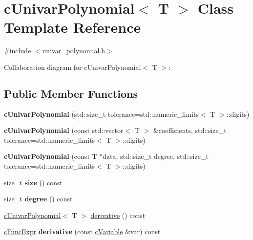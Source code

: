\hypertarget{classcUnivarPolynomial}{\section{c\-Univar\-Polynomial$<$ T $>$ Class Template Reference}
\label{classcUnivarPolynomial}
}


{\ttfamily \#include $<$univar\-\_\-polynomial.\-h$>$}



Collaboration diagram for c\-Univar\-Polynomial$<$ T $>$\-:
\subsection*{Public Member Functions}
\begin{DoxyCompactItemize}
\item 
\hypertarget{classcUnivarPolynomial_a4ff2b63bc58ec4ab56f270237caf6f0b}{{\bfseries c\-Univar\-Polynomial} (std\-::size\-\_\-t tolerance=std\-::numeric\-\_\-limits$<$ T $>$\-::digits)}\label{classcUnivarPolynomial_a4ff2b63bc58ec4ab56f270237caf6f0b}

\item 
\hypertarget{classcUnivarPolynomial_a967378cb72bc82a047800e9b52051ccd}{{\bfseries c\-Univar\-Polynomial} (const std\-::vector$<$ T $>$ \&coefficients, std\-::size\-\_\-t tolerance=std\-::numeric\-\_\-limits$<$ T $>$\-::digits)}\label{classcUnivarPolynomial_a967378cb72bc82a047800e9b52051ccd}

\item 
\hypertarget{classcUnivarPolynomial_aa32abc2e773a74b65e960a24cf65f70b}{{\bfseries c\-Univar\-Polynomial} (const T $\ast$data, std\-::size\-\_\-t degree, std\-::size\-\_\-t tolerance=std\-::numeric\-\_\-limits$<$ T $>$\-::digits)}\label{classcUnivarPolynomial_aa32abc2e773a74b65e960a24cf65f70b}

\item 
\hypertarget{classcUnivarPolynomial_adbabe3b2fa5052c19f87327de092c8fb}{size\-\_\-t {\bfseries size} () const }\label{classcUnivarPolynomial_adbabe3b2fa5052c19f87327de092c8fb}

\item 
\hypertarget{classcUnivarPolynomial_ad4b0b24cc9229a9b96eb71e224db8c03}{size\-\_\-t {\bfseries degree} () const }\label{classcUnivarPolynomial_ad4b0b24cc9229a9b96eb71e224db8c03}

\item 
\hyperlink{classcUnivarPolynomial}{c\-Univar\-Polynomial}$<$ T $>$ \hyperlink{classcUnivarPolynomial_af0fa0596f636515bcab1e2dedc2fde79}{derivative} () const 
\item 
\hypertarget{classcUnivarPolynomial_af10a9488a11ae1e8c6dfac2fe5fc576e}{\hyperlink{classcFuncExpr}{c\-Func\-Expr} {\bfseries derivative} (const \hyperlink{classcVariable}{c\-Variable} \&var) const }\label{classcUnivarPolynomial_af10a9488a11ae1e8c6dfac2fe5fc576e}


\end{DoxyCompactItemize}
